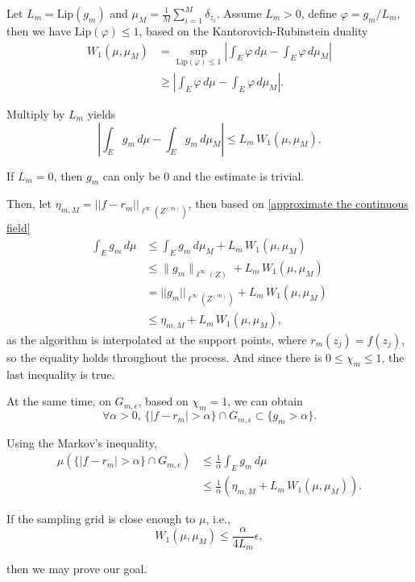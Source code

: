 \documentclass[12pt,a4paper]{article}  %
\theoremstyle{definition}
\numberwithin{equation}{section}
\begin{document}
Let $L_m=\text{Lip}(g_m)$ and $\mu_M=\frac{1}{M}\sum\limits_{i=1}^M\delta_{z_i}$. Assume $L_m>0$, define $\varphi=g_m/L_m$, then we have $\text{Lip}(\varphi)\le1$, based on the Kantorovich-Rubinstein duality
\begin{align*}
    W_1(\mu,\mu_M)
    &=\sup\limits_{\text{Lip}(\varphi)\le1}|\int_E\varphi\,d\mu-\int_E\varphi\,d\mu_M|\\
    &\ge|\int_E\varphi\,d\mu-\int_E\varphi\,d\mu_M|.
\end{align*}

Multiply by $L_m$ yields
\begin{equation}
    |\int_Eg_m\,d\mu-\int_Eg_m\,d\mu_M|\le L_m\,W_1(\mu,\mu_M).\label{approximate the continuous field}
\end{equation}

If $L_m=0$, then $g_m$ can only be 0 and the estimate is trivial.

Then, let $\eta_{m,M}=||f-r_m||_{\ell^\infty(Z^{(m)})}$, then based on \eqref{approximate the continuous field}
\begin{align*}
\int_E g_m \, d\mu
&\le \int_E g_m \, d\mu_M
   + L_m\, W_1(\mu,\mu_M) \\
&\le \|g_m\|_{\ell^\infty(Z)}
   + L_m\, W_1(\mu,\mu_M) \\
&=||g_m||_{\ell^{\infty}(Z^{(m)})}+ L_m\, W_1(\mu,\mu_M)\\
&\le \eta_{m,M}
   + L_m\, W_1(\mu,\mu_M),
\end{align*}
as the algorithm is interpolated at the support points, where $r_m(z_j)=f(z_j)$, so the equality holds throughout the process. And since there is $0\le\chi_m\le1$, the last inequality is true.

At the same time, on $G_{m,\epsilon}$, based on $\chi_m=1$, we can obtain
\[
\forall\alpha>0,\,\{|f-r_m|>\alpha\}\cap G_{m,\epsilon}\subset\{g_m>\alpha\}.
\]

Using the Markov's inequality,
\begin{align*}
    \mu(\{|f-r_m|>\alpha\}\cap G_{m,\epsilon})&\le\frac{1}{\alpha}\int_Eg_m\,d\mu\\
    &\le\frac{1}{\alpha}(\eta_{m,M}+L_m\,W_1(\mu,\mu_M)).
\end{align*}

If the sampling grid is close enough to $\mu$, i.e.,
\begin{equation}
     W_1(\mu,\mu_M)\le \frac{\alpha}{4L_m}\epsilon,\label{eq:sampling grid}
\end{equation}

then we may prove our goal.
\end{document}

